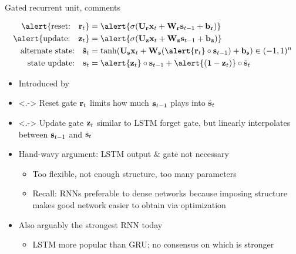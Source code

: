 \begin{frame}{Gated recurrent unit, comments}
    \begin{block}{}
        \vspace{-5mm}
        \begin{align*}
            \alert{\text{reset:} \quad \r_t} &= \alert{\sigma(\U_\r \x_t + \W_\r \s_{t-1} + \b_\r)} \\
            \alert{\text{update:} \quad \z_t} &= \alert{\sigma(\U_\z \x_t + \W_\z \s_{t-1} + \b_\z)} \\
            \text{alternate state:} \quad \st_t &= \tanh(\U_\s \x_t + \W_\s (\alert{\r_t} \circ \s_{t-1}) + \b_\s) \in (-1, 1)^n \\
            \text{state update:} \quad \s_t &= \alert{\z_t} \circ \s_{t-1} + \alert{(\one - \z_t)} \circ \st_t
        \end{align*}
    \end{block}

    \begin{itemize}
        \item<+-> Introduced by \citet{ChoEMNLP14}
        \item<.-> \alert{Reset gate $\mathbf{r}_t$} limits how much $\mathbf{s}_{t-1}$ plays into $\tilde{\mathbf{s}}_t$
        \item<.-> \alert{Update gate $\mathbf{z}_t$} similar to LSTM forget gate, but linearly interpolates between $\mathbf{s}_{t-1}$ and $\tilde{\mathbf{s}}_t$
        \item<+-> Hand-wavy argument: LSTM output \& gate not necessary
        \begin{itemize}
            \item Too flexible, not enough structure, too many parameters
            \item Recall: RNNs preferable to dense networks because imposing structure makes good network easier to obtain via optimization
        \end{itemize}
        \item<+-> Also arguably the strongest RNN today \citep{JozefowiczICML15}
        \begin{itemize}
            \item LSTM more popular than GRU; no consensus on which is stronger
        \end{itemize}
    \end{itemize}
\end{frame}

